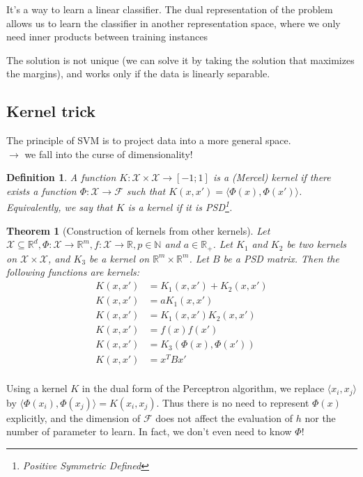 \documentclass{article}
\newtheorem{thm}{Theorem}
\newtheorem{defi}{Definition}
\begin{document}
It's a way to learn a linear classifier. The dual representation of the problem allows us to learn the classifier in another representation space, where we only need inner products between training instances
\bigskip

The solution is not unique (we can solve it by taking the solution that maximizes the margins), and works only if the data is linearly separable.


\subsection{Kernel trick}
The principle of SVM is to project data into a more general space.\\
$\to$ we fall into the curse of dimensionality!
\bigskip

\begin{defi}
A function $K: \mathcal{X} \times \mathcal{X} \to [-1;1]$ is a (Mercel) \emph{kernel} if there exists a function $\Phi: \mathcal{X}\to \mathcal{F}$ such that $K(x,x')=\langle\Phi(x),\Phi(x')\rangle$. Equivalently, we say that $K$ is a kernel if it is PSD\footnote{Positive Symmetric Defined}.
\end{defi}

\begin{thm}[Construction of kernels from other kernels]
Let $\mathcal{X}\subseteq \mathbb{R}^d, \Phi: \mathcal{X} \to \mathbb{R}^m, f:\mathcal{X}\to\mathbb{R},p\in \mathbb{N}$ and $a \in \mathbb{R}_+$. Let $K_1$ and $K_2$ be two kernels on $\mathcal{X} \times \mathcal{X}$, and $K_3$ be a kernel on $\mathbb{R}^m\times\mathbb{R}^m$. Let $B$ be a PSD matrix. Then the following functions are kernels:
\begin{align*}
K(x,x') & = K_1(x,x') + K_2(x,x')\\
K(x,x') & = aK_1(x,x')\\
K(x,x') & = K_1(x,x')K_2(x,x')\\
K(x,x') & = f(x)f(x')\\
K(x,x') & = K_3(\Phi (x),\Phi (x'))\\
K(x,x') & = x^T B x'\\
\end{align*}
\end{thm}

Using a kernel $K$ in the dual form of the Perceptron algorithm, we replace $\langle x_i,x_j \rangle$ by $\langle \Phi(x_i),\Phi(x_j)\rangle = K(x_i,x_j)$. Thus there is no need to represent $\Phi(x)$ explicitly, and the dimension of $\mathcal{F}$ does not affect the evaluation of $h$ nor the number of parameter to learn. In fact, we don't even need to know $\Phi$!
\end{document}
